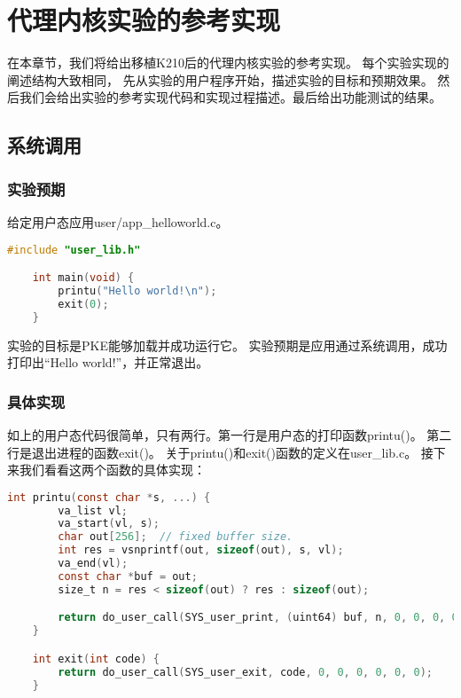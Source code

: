 \chapter{代理内核实验的参考实现}

在本章节，我们将给出移植K210后的代理内核实验的参考实现。
每个实验实现的阐述结构大致相同，
先从实验的用户程序开始，描述实验的目标和预期效果。
然后我们会给出实验的参考实现代码和实现过程描述。最后给出功能测试的结果。

\section{系统调用}

\subsection{实验预期}

给定用户态应用user/app\_helloworld.c。

\begin{lstlisting}[caption={用户态应用app\_helloworld.c}, label={lst:app_helloworld}, language=C]
    #include "user_lib.h"

    int main(void) {
        printu("Hello world!\n");
        exit(0);
    }   
\end{lstlisting}

实验的目标是PKE能够加载并成功运行它。
实验预期是应用通过系统调用，成功打印出“Hello world!”，并正常退出。


\subsection{具体实现}

如上的用户态代码很简单，只有两行。第一行是用户态的打印函数printu()。
第二行是退出进程的函数exit()。
关于printu()和exit()函数的定义在user\_lib.c。
接下来我们看看这两个函数的具体实现：

\begin{lstlisting}[caption={printu与exit的实现}, label={lst:printu_exit}, language=C]
    int printu(const char *s, ...) {
        va_list vl;
        va_start(vl, s);
        char out[256];  // fixed buffer size.
        int res = vsnprintf(out, sizeof(out), s, vl);
        va_end(vl);
        const char *buf = out;
        size_t n = res < sizeof(out) ? res : sizeof(out);

        return do_user_call(SYS_user_print, (uint64) buf, n, 0, 0, 0, 0, 0);
    }

    int exit(int code) {
        return do_user_call(SYS_user_exit, code, 0, 0, 0, 0, 0, 0);
    }   
\end{lstlisting}

